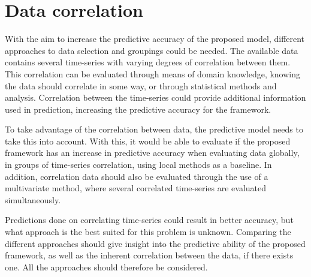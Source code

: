 \section{Data correlation}
\label{section:Architecture:ModelStructure}

With the aim to increase the predictive accuracy of the proposed model,
different approaches to data selection and groupings could be needed.
The available data contains several time-series with varying degrees of correlation between them.
This correlation can be evaluated through means of domain knowledge,
knowing the data should correlate in some way, or through statistical methods and analysis.
Correlation between the time-series could provide additional information used in prediction,
increasing the predictive accuracy for the framework.


To take advantage of the correlation between data,
the predictive model needs to take this into account.
With this, it would be able to evaluate if the proposed framework has an increase in predictive accuracy
when evaluating data globally, in groups of time-series correlation, using local methods as a baseline.
In addition, correlation data should also be evaluated through the use of a multivariate method,
where several correlated time-series are evaluated simultaneously.


Predictions done on correlating time-series could result in better accuracy,
but what approach is the best suited for this problem is unknown.
Comparing the different approaches should give insight into the predictive ability of the proposed framework,
as well as the inherent correlation between the data, if there exists one.
All the approaches should therefore be considered.

